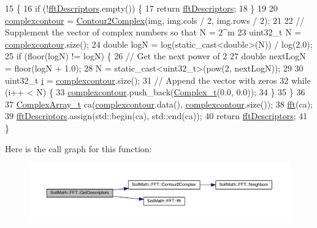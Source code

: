 \begin{DoxyCode}
15                                                   \{
16   \textcolor{keywordflow}{if} (!\hyperlink{class_soil_math_1_1_f_f_t_a466b360529319d0e6e3220f446f703be}{fftDescriptors}.empty()) \{
17     \textcolor{keywordflow}{return} \hyperlink{class_soil_math_1_1_f_f_t_a466b360529319d0e6e3220f446f703be}{fftDescriptors};
18   \}
19 
20   \hyperlink{class_soil_math_1_1_f_f_t_a48141f0c777ca86f2e536f88b509b639}{complexcontour} = \hyperlink{class_soil_math_1_1_f_f_t_a18a95490ea8e929584c2af6569dec3b6}{Contour2Complex}(img, img.cols / 2, img.rows / 2);
21 
22   \textcolor{comment}{// Supplement the vector of complex numbers so that N = 2^m}
23   uint32\_t N = \hyperlink{class_soil_math_1_1_f_f_t_a48141f0c777ca86f2e536f88b509b639}{complexcontour}.size();
24   \textcolor{keywordtype}{double} logN = log(static\_cast<double>(N)) / log(2.0);
25   \textcolor{keywordflow}{if} (floor(logN) != logN) \{
26     \textcolor{comment}{// Get the next power of 2}
27     \textcolor{keywordtype}{double} nextLogN = floor(logN + 1.0);
28     N = \textcolor{keyword}{static\_cast<}uint32\_t\textcolor{keyword}{>}(pow(2, nextLogN));
29 
30     uint32\_t \hyperlink{_comparision_pictures_2_createtest_image_8m_a6f6ccfcf58b31cb6412107d9d5281426}{i} = \hyperlink{class_soil_math_1_1_f_f_t_a48141f0c777ca86f2e536f88b509b639}{complexcontour}.size();
31     \textcolor{comment}{// Append the vector with zeros}
32     \textcolor{keywordflow}{while} (i++ < N) \{
33       \hyperlink{class_soil_math_1_1_f_f_t_a48141f0c777ca86f2e536f88b509b639}{complexcontour}.push\_back(\hyperlink{_soil_math_types_8h_a26c307796ad803485b0376c90026d8f7}{Complex\_t}(0.0, 0.0));
34     \}
35   \}
36 
37   \hyperlink{_soil_math_types_8h_a5118c9f6b02a06945c93a3893e51febe}{ComplexArray\_t} ca(\hyperlink{class_soil_math_1_1_f_f_t_a48141f0c777ca86f2e536f88b509b639}{complexcontour}.data(), 
      \hyperlink{class_soil_math_1_1_f_f_t_a48141f0c777ca86f2e536f88b509b639}{complexcontour}.size());
38   \hyperlink{class_soil_math_1_1_f_f_t_a48bc7ad948d820d6f87b3e353b6d1cd4}{fft}(ca);
39   \hyperlink{class_soil_math_1_1_f_f_t_a466b360529319d0e6e3220f446f703be}{fftDescriptors}.assign(std::begin(ca), std::end(ca));
40   \textcolor{keywordflow}{return} \hyperlink{class_soil_math_1_1_f_f_t_a466b360529319d0e6e3220f446f703be}{fftDescriptors};
41 \}
\end{DoxyCode}


Here is the call graph for this function\+:\nopagebreak
\begin{figure}[H]
\begin{center}
\leavevmode
\includegraphics[width=350pt]{class_soil_math_1_1_f_f_t_af5fb6f4804079ee184a314e2f0a0f2fc_cgraph}
\end{center}
\end{figure}




